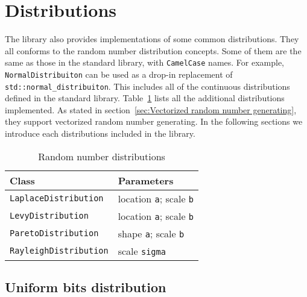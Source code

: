 \section{Distributions}
\label{sec:Distributions}

The library also provides implementations of some common distributions. They
all conforms to the \cppoo random number distribution concepts. Some of them
are the same as those in the \cppoo standard library, with \verb|CamelCase|
names. For example, \verb|NormalDistribuiton| can be used as a drop-in
replacement of \verb|std::normal_distribuiton|. This includes all of the
continuous distributions defined in the standard library.
Table~\ref{tab:Random number distributions} lists all the additional
distributions implemented. As stated in section~\ref{sec:Vectorized random
  number generating}, they support vectorized random number generating. In the
following sections we introduce each distributions included in the library.

\begin{table}
  \begin{tabularx}{\textwidth}{lX}
    \toprule
    Class & Parameters \\
    \midrule
    \verb|LaplaceDistribution|  & location \verb|a|; scale \verb|b| \\
    \verb|LevyDistribution|     & location \verb|a|; scale \verb|b| \\
    \verb|ParetoDistribution|   & shape \verb|a|; scale \verb|b| \\
    \verb|RayleighDistribution| & scale \verb|sigma| \\
    \bottomrule
  \end{tabularx}
  \caption{Random number distributions}
  \label{tab:Random number distributions}
\end{table}

\subsection{Uniform bits distribution}
\label{sub:Uniform bits distribution}

